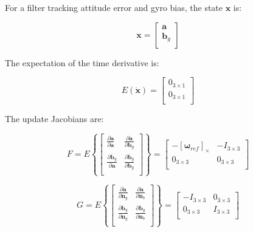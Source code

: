 \documentclass[a4paper]{paper}
\begin{document}
For a filter tracking attitude error and gyro bias, the state $\bm{x}$ is:

\begin{equation}
    \bm{x} = \left[
        \begin{matrix}
            \bm{a}\\[0.3em]
            \bm{b}_g\\
        \end{matrix}
        \right]
\end{equation}

The expectation of the time derivative is:

\begin{equation}
    E (\bm{\dot x}) = \left[
        \begin{matrix}
            0_{3\times1}\\[0.3em]
            0_{3\times1}\\
        \end{matrix}
        \right]
\end{equation}

The update Jacobians are:

\begin{equation}
    F = E \left\{
        \left[
        \begin{matrix}
            \frac{\partial \dot{\bm{a}}}{\partial \bm{a}} & \frac{\partial \dot{\bm{a}}}{\partial \bm{b}_g}\\[0.3em]
            \frac{\partial \dot{\bm{b}_g}}{\partial \bm{a}} & \frac{\partial \dot{\bm{b}_g}}{\partial \bm{b}_g}\\
        \end{matrix}
        \right]
    \right\}
    = \left[
        \begin{matrix}
            -{[\bm{\omega}_{ref}]}_\times & -I_{3\times3}\\[0.3em]
            0_{3\times3} & 0_{3\times3}\\
        \end{matrix}
        \right]
\end{equation}

\begin{equation}
    G = E \left\{
        \left[
        \begin{matrix}
            \frac{\partial \dot{\bm{a}}}{\partial \bm{n}_g} & \frac{\partial \dot{\bm{a}}}{\partial \bm{n}_b}\\[0.3em]
            \frac{\partial \dot{\bm{b}_g}}{\partial \bm{n}_g} & \frac{\partial \dot{\bm{b}_g}}{\partial \bm{n}_b}\\
        \end{matrix}
        \right]
    \right\}
    = \left[
        \begin{matrix}
            -I_{3\times3} & 0_{3\times3}\\[0.3em]
            0_{3\times3} & I_{3\times3}\\
        \end{matrix}
        \right]
\end{equation}
\end{document}
